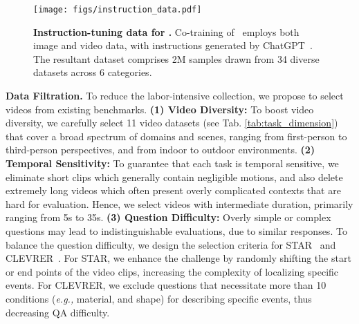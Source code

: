 \begin{figure*}[thp]
    \centering
    \texttt{[image: figs/instruction\_data.pdf]}
    \vspace{-0.35cm}
    \caption{
    \textbf{Instruction-tuning data for \ModelName.}
    Co-training of \ModelName\  employs both image and video data, with instructions generated by ChatGPT~\cite{chatgpt}. 
    The resultant dataset comprises 2M samples drawn from 34 diverse datasets across 6 categories. 
    }
    \label{fig:instruction}
    \vspace{-0.3cm}
\end{figure*}

\textbf{Data Filtration.} 
To reduce the labor-intensive collection,
we propose to select videos from existing benchmarks.
\textbf{(1) Video Diversity:}
To boost video diversity,
we carefully select 11 video datasets (see Tab. \ref{tab:task_dimension}) that cover a broad spectrum of domains and scenes,
ranging from first-person to third-person perspectives, 
and from indoor to outdoor environments.
\textbf{(2) Temporal Sensitivity:}
To guarantee that each task is temporal sensitive,
we eliminate short clips which generally contain negligible motions, %
and also delete extremely long videos which often present overly complicated contexts that are hard for evaluation. 
Hence,
we select videos with intermediate duration, primarily ranging from 5s to 35s.
\textbf{(3) Question Difficulty:}
Overly simple or complex questions may lead to indistinguishable evaluations, due to similar responses.
To balance the question difficulty,
we design the selection criteria for STAR~\cite{star} and CLEVRER~\cite{clevr}.
For STAR, 
we enhance the challenge by randomly shifting the start or end points of the video clips, 
increasing the complexity of localizing specific events. 
For CLEVRER, 
we exclude questions that necessitate more than 10 conditions (\textit{e.g.,} material, and shape) for describing specific events,
thus decreasing QA difficulty.

